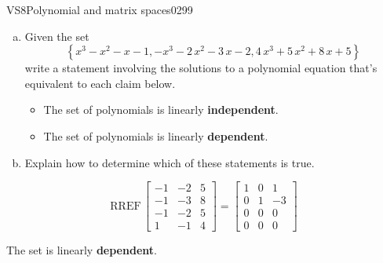 \begin{exercise}{VS8}{Polynomial and matrix spaces}{0299} 
\begin{exerciseStatement} 

\begin{enumerate}[(a)]
\item  

 Given the set \[\left\{ x^{3} - x^{2} - x - 1 , -x^{3} - 2 \, x^{2} - 3 \, x - 2 , 4 \, x^{3} + 5 \, x^{2} + 8 \, x + 5 \right\}\] write a statement involving the solutions to a polynomial equation that's equivalent to each claim below. 

 

\begin{itemize}
\item  

 The set of polynomials is linearly \textbf{independent}. 

 
\item  

 The set of polynomials is linearly \textbf{dependent}. 

 
\end{itemize}

     
\item  

 Explain how to determine which of these statements is true. 

 
\end{enumerate}

     \end{exerciseStatement}
 \begin{exerciseAnswer} 

 \[
\mathrm{RREF}\, \left[\begin{array}{ccc}
-1 & -2 & 5 \\
-1 & -3 & 8 \\
-1 & -2 & 5 \\
1 & -1 & 4
\end{array}\right] = \left[\begin{array}{ccc}
1 & 0 & 1 \\
0 & 1 & -3 \\
0 & 0 & 0 \\
0 & 0 & 0
\end{array}\right]
            \] 

 

 The set is linearly \textbf{dependent}. 

 \end{exerciseAnswer}
 \end{exercise}


